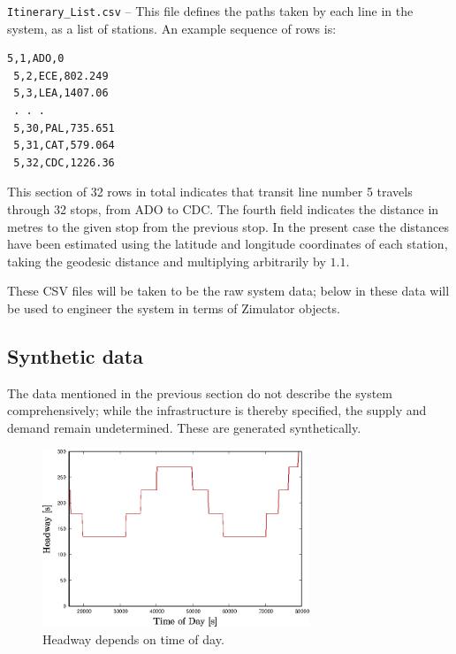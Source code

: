 {\tt Itinerary\_List.csv} -- This file defines the paths taken by each line in the system, as a list of stations.
An example sequence of rows is:
\begin{lstlisting}[mathescape]
 5,1,ADO,0
 5,2,ECE,802.249
 5,3,LEA,1407.06
 . . .
 5,30,PAL,735.651
 5,31,CAT,579.064
 5,32,CDC,1226.36
\end{lstlisting}
This section of 32 rows in total indicates that transit line number 5 travels through
32 stops, from ADO to CDC.  The fourth field indicates the distance
in metres to the given stop from the previous stop.  In the present
case the distances have been estimated using the latitude and
longitude coordinates of each station, taking the geodesic distance
and multiplying arbitrarily by $1.1$.

These CSV files will be taken to be the raw system data; below in 
these data will be used to engineer the system in terms of Zimulator objects.

\subsection{Synthetic data}

The data mentioned in the previous section do not describe the system
comprehensively; while the infrastructure is thereby specified, the
supply and demand remain undetermined. These are generated synthetically.

\begin{figure}[ht]
  \centering
  \includegraphics[angle=0,width=8cm]{70_figs/_headway_vs_ToD.eps}
  \caption{Headway depends on time of day.}
  \label{hwdep}
\end{figure}

